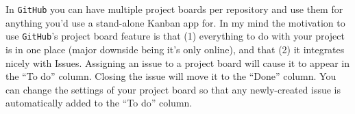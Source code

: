 \documentclass[12pt,letterpaper]{article}
\begin{document}
In \texttt{GitHub} you can have multiple project boards per repository and use 
them for anything you'd use a stand-alone Kanban app for.
In my mind the motivation to use \texttt{GitHub}'s project board feature is that
(1) everything to do with your project is in one place
(major downside being it's only online), and that
(2) it integrates nicely with Issues.
Assigning an issue to a project board will cause it to appear in the ``To do'' column.
Closing the issue will move it to the ``Done'' column.
You can change the settings of your project board so that any newly-created 
issue is automatically added to the ``To do'' column.
\end{document}
